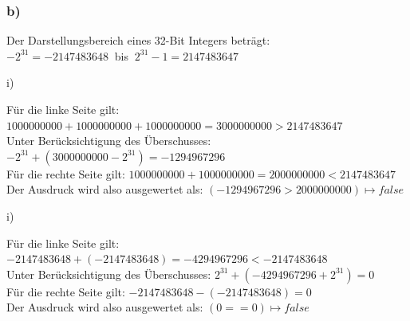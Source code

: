 \documentclass[a4paper]{article}
\begin{document}
\subsubsection*{ b) }

	Der Darstellungsbereich eines 32-Bit Integers beträgt: \\
	 $-2^{31} = -2147483648 ~ $ bis $ ~ 2^{31}-1 = 2147483647$ \\

\par{ i) }

	Für die linke Seite gilt: $1000000000 + 1000000000 + 1000000000 = 3000000000 > 2147483647 $ \\ 
	Unter Berücksichtigung des Überschusses: $-2^{31} + (3000000000-2^{31}) = -1294967296 $ \\
	Für die rechte Seite gilt: $1000000000 + 1000000000 = 2000000000 < 2147483647 $ \\
	Der Ausdruck wird also ausgewertet als: $ (-1294967296 > 2000000000) \mapsto false$ \\

\par{ i) }

	Für die linke Seite gilt: $-2147483648 + (-2147483648) = -4294967296 < -2147483648 $ \\
	Unter Berücksichtigung des Überschusses: $2^{31} + (-4294967296+2^{31}) = 0 $ \\
	Für die rechte Seite gilt: $-2147483648 - (-2147483648) = 0 $ \\ 
	Der Ausdruck wird also ausgewertet als: $ (0 == 0) \mapsto false$
\end{document}
